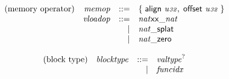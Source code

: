 \vspace{1ex}

$$
\begin{array}{@{}lrrl@{}l@{}}
\mbox{(memory operator)} & {\mathit{memop}} &::=& \{\; \begin{array}[t]{@{}l@{}l@{}}
\mathsf{align}~{\mathit{u{\scriptstyle32}}},\; \mathsf{offset}~{\mathit{u{\scriptstyle32}}} \;\}\end{array} \\
& {\mathit{vloadop}} &::=& {{{{{\mathit{nat}}}{\mathsf{x}}}{\mathsf{x}}}{\mathsf{\_}}}{{\mathit{nat}}} \\ &&|&
{{{\mathit{nat}}}{\mathsf{\_}}}{\mathsf{splat}} \\ &&|&
{{{\mathit{nat}}}{\mathsf{\_}}}{\mathsf{zero}} \\
\end{array}
$$

\vspace{1ex}

$$
\begin{array}{@{}lrrl@{}l@{}}
\mbox{(block type)} & {\mathit{blocktype}} &::=& {{\mathit{valtype}}^?} \\ &&|&
{\mathit{funcidx}} \\
\end{array}
$$

